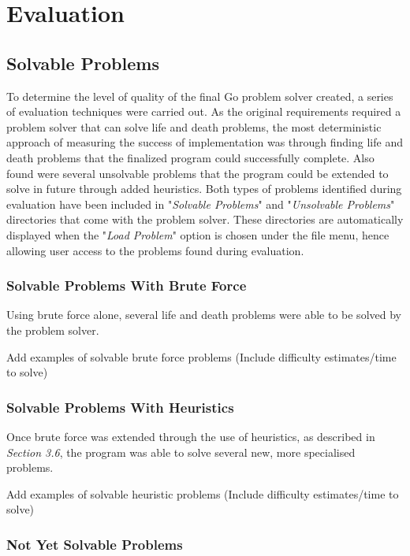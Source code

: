 \documentclass{l3proj}
\begin{document}
\chapter{Evaluation}
\label{evaluation}

\section{Solvable Problems}

To determine the level of quality of the final Go problem solver created, a series of evaluation techniques were carried out. As the original requirements required a problem solver that can solve life and death problems, the most deterministic approach of measuring the success of implementation was through finding life and death problems that the finalized program could successfully complete. Also found were several unsolvable problems that the program could be extended to solve in future through added heuristics. Both types of problems identified during evaluation have been included in "\textit{Solvable Problems}" and "\textit{Unsolvable Problems}" directories that come with the problem solver. These directories are automatically displayed when the "\textit{Load Problem}" option is chosen under the file menu, hence allowing user access to the problems found during evaluation.

\subsection{Solvable Problems With Brute Force}

Using brute force alone, several life and death problems were able to be solved by the problem solver.

Add examples of solvable brute force problems (Include difficulty estimates/time to solve)

\subsection{Solvable Problems With Heuristics}

Once brute force was extended through the use of heuristics, as described in \textit{Section 3.6}, the program was able to solve several new, more specialised problems.

Add examples of solvable heuristic problems (Include difficulty estimates/time to solve)

\subsection{Not Yet Solvable Problems}
\end{document}
